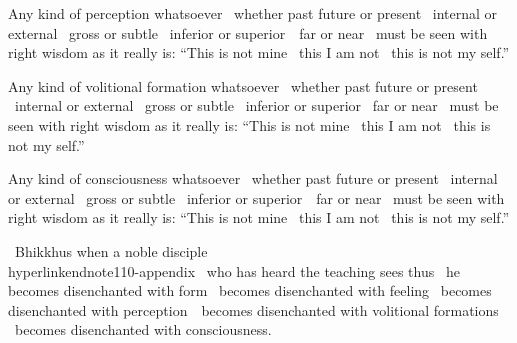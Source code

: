 \begin{english-only-hang}
  Any kind of perception whatsoever \breathmark\ whether past future or present \breathmark\ internal or external \breathmark\ gross or subtle \breathmark\ inferior or \mbox{superior}~\breathmark\ far or near \breathmark\ must be seen with right wisdom as it really is: ``This is not mine \breathmark\ this I am not \breathmark\ this is not my self.''
\end{english-only-hang}

\begin{english-only-hang}
  Any kind of volitional formation whatsoever \breathmark\ whether past future or present \breathmark\ internal or external \breathmark\ gross or subtle \breathmark\ inferior or superior \breathmark\ far or near \breathmark\ must be seen with right wisdom as it really is: ``This is not mine \breathmark\ this I am not \breathmark\ this is not my self.''
\end{english-only-hang}

\begin{english-only-hang}
  Any kind of consciousness whatsoever \breathmark\ whether past future or present \breathmark\ internal or external \breathmark\ gross or subtle \breathmark\ inferior or \mbox{superior}~\breathmark\ far or near \breathmark\ must be seen with right wisdom as it really is: ``This is not mine \breathmark\ this I am not \breathmark\ this is not my self.''
\end{english-only-hang}

\begin{english-only-hang}
  \anglebracketleft\ \hspace{-0.5mm}Bhikkhus when a noble disciple \hspace{-0.5mm}\anglebracketright\\hyperlink{endnote110-appendix}{\hypertarget{endnote110-body}{}}
  \breathmark\ who has heard the teaching\hyperlink{endnote111-appendix}{\hypertarget{endnote111-body}{}}
  sees thus \breathmark\ he becomes disenchanted with form \breathmark\ becomes disenchanted with feeling \breathmark\ becomes disenchanted with \mbox{perception}~\breathmark\ becomes disenchanted with volitional formations \breathmark\ becomes disenchanted with consciousness.
\end{english-only-hang}

